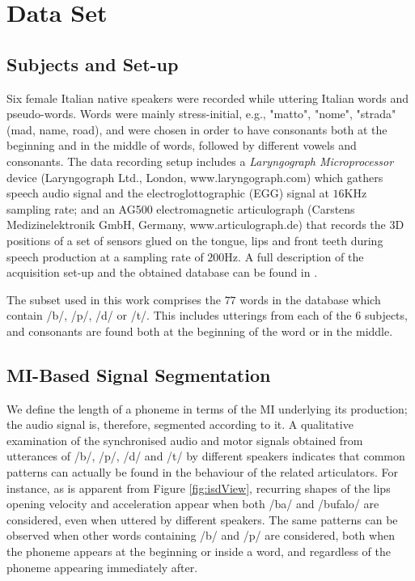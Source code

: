 \section{Data Set}
\label{sec:dataset}

\subsection{Subjects and Set-up}
\label{subsec:setup}

Six female Italian native speakers were recorded while uttering
Italian words and pseudo-words. Words were mainly stress-initial, e.g.,
"matto", "nome", "strada" (mad, name, road), and were chosen in order
to have consonants both at the beginning and in the middle of
words, followed by different vowels and consonants.
The data recording setup includes a \emph{Laryngograph Microprocessor}
device (Laryngograph Ltd., London, www.laryngograph.com) which gathers speech audio
signal and the electroglottographic (EGG) signal at $16$KHz sampling
rate; and an AG500 electromagnetic articulograph (Carstens Medizinelektronik
GmbH, Germany, www.articulograph.de) that records the
3D positions of a set of sensors glued on the tongue, lips and front teeth
during speech production at a sampling rate of $200$Hz. A full description of the 
acquisition set-up and the obtained database can be found in \cite{tavella}.

The subset used in this work comprises the $77$ words in the database
which contain /b/, /p/, /d/ or /t/. This includes utterings from each of the
$6$ subjects, and consonants are found both at the beginning of the word or
in the middle.

\subsection{MI-Based Signal Segmentation}
\label{subsec:segm}

We define the length of a phoneme in terms of the MI underlying its production;
the audio signal is, therefore, segmented according to it.
A qualitative examination of the synchronised audio and motor
signals obtained from utterances of /b/, /p/, /d/ and /t/
by different speakers indicates that common patterns can
actually be found in the behaviour of the related articulators.
For instance, as is apparent from Figure \ref{fig:isdView}, 
recurring shapes of the lips opening velocity and acceleration appear
when both /ba/ and /bufalo/ are considered, even when uttered by different
speakers. The same patterns can be observed when other words containing
/b/ and /p/ are considered, both when the phoneme appears at the beginning
or inside a word, and regardless of the phoneme appearing immediately after.

